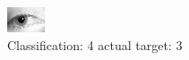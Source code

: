 \begin{figure}[h!]
\begin{center}
\includegraphics[width=0.60\columnwidth]{figures/ID1313_class_4_target_3.png}
\end{center}
\caption{ Classification: 4 actual target: 3}
\label{fig:ID1313_class_4_target_3}
\end{figure}
